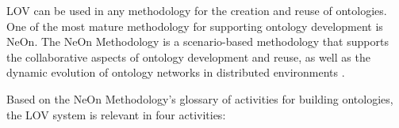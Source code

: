 \documentclass{iosart2c}
\begin{document}
LOV can be used in any methodology for the creation and reuse of ontologies. One of the most mature methodology for supporting ontology development is NeOn.  
The NeOn Methodology is a scenario-based methodology that supports the collaborative aspects of ontology development and reuse, as well as the dynamic evolution of ontology networks in distributed environments \cite{MC10}. 

Based on the NeOn Methodology's glossary of activities for building ontologies, the LOV system is relevant in four activities:
\end{document}

